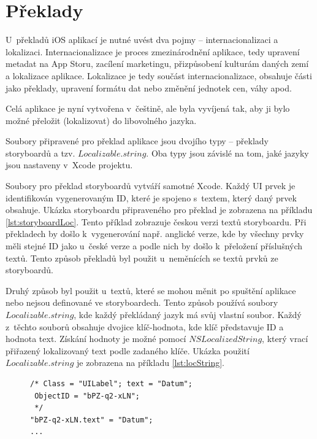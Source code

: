 \documentclass[thesis=M,czech]{FITthesis}[2012/06/26]
\begin{document}
\section{Překlady}
U~překladů iOS aplikací je nutné uvést dva pojmy -- internacionalizaci a lokalizaci. Internacionalizace je proces zmezinárodnění aplikace, tedy upravení metadat na App Storu, zacílení marketingu, přizpůsobení kulturám daných zemí a lokalizace aplikace. Lokalizace je tedy součást internacionalizace, obsahuje části jako překlady, upravení formátu dat nebo změnění jednotek cen, váhy apod. \cite{internationalization}

Celá aplikace je nyní vytvořena v~češtině, ale byla vyvíjená tak, aby ji bylo možné přeložit (lokalizovat) do libovolného jazyka.

Soubory připravené pro překlad aplikace jsou dvojího typy -- překlady storyboardů a tzv. $Localizable.string$. Oba typy jsou závislé na tom, jaké jazyky jsou nastaveny v~Xcode projektu.

Soubory pro překlad storyboardů vytváří samotné Xcode. Každý UI prvek je identifikován vygenerovaným ID, které je spojeno s~textem, který daný prvek obsahuje. Ukázka storyboardu připraveného pro překlad je zobrazena na příkladu \ref{lst:storyboardLoc}. Tento příklad zobrazuje českou verzi textů storyboardu. Při překladech by došlo k~vygenerování např. anglické verze, kde by všechny prvky měli stejné ID jako u~české verze a podle nich by došlo k~přeložení příslušných textů. Tento způsob překladů byl použit u~neměnících se textů prvků ze storyboardů.

Druhý způsob byl použit u~textů, které se mohou měnit po spuštění aplikace nebo nejsou definované ve storyboardech. Tento způsob používá soubory $Localizable.string$, kde každý překládaný jazyk má svůj vlastní soubor. Každý z~těchto souborů obsahuje dvojice klíč-hodnota, kde klíč představuje ID a hodnota text. Získání hodnoty je možné pomocí $NSLocalizedString$, který vrací přiřazený lokalizovaný text podle zadaného klíče. Ukázka použití $Localizable.string$ je zobrazena na příkladu \ref{lst:locString}.

\begin{figure}
\begin{minipage}{\linewidth}
\begin{lstlisting}[caption={Ukázka přípravy storyboardu pro překlad},label={lst:storyboardLoc}]
/* Class = "UILabel"; text = "Datum";
 ObjectID = "bPZ-q2-xLN";
 */
"bPZ-q2-xLN.text" = "Datum";
...
\end{lstlisting}
\end{minipage}
\end{figure}
\end{document}
